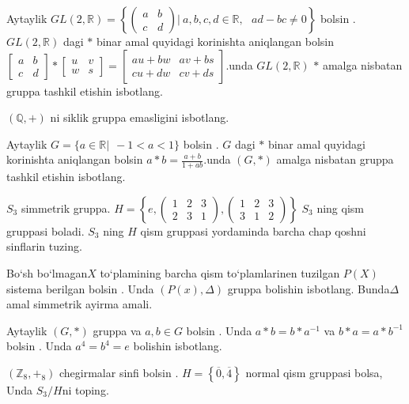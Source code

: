 Aytaylik \(GL(2,\mathbb{R}) = \left\{ \begin{pmatrix}
a & b \\
c & d
\end{pmatrix}|\ a,b,c,d\mathbb{\in R},\ \ \ ad - bc \neq 0 \right\}\) bo\textquotesingle lsin . \(GL(2,\mathbb{R})\) dagi \(*\) binar amal quyidagi ko\textquotesingle rinishta aniqlangan bo\textquotesingle lsin \(\begin{bmatrix}
a & b \\
c & d
\end{bmatrix}*\begin{bmatrix}
u & v \\
w & s
\end{bmatrix} = \begin{bmatrix}
au + bw & av + bs \\
cu + dw & cv + ds
\end{bmatrix}\).unda \(GL(2,\mathbb{R})\) \(*\) amalga nisbatan gruppa tashkil etishin isbotlang.

\((\mathbb{Q}, + )\) ni siklik gruppa emasligini isbotlang.

Aytaylik \(G = \{ a\mathbb{\in R}|\ \  - 1 < a < 1\}\) bo\textquotesingle lsin . \(G\) dagi \(*\) binar amal quyidagi ko\textquotesingle rinishta aniqlangan bo\textquotesingle lsin \(a*b = \frac{a + b}{1 + ab}.\)unda \((G,*)\) amalga nisbatan gruppa tashkil etishin isbotlang.

\(S_{3}\) simmetrik gruppa. \(H = \left\{ e,\begin{pmatrix}
1 & 2 & 3 \\
2 & 3 & 1
\end{pmatrix},\begin{pmatrix}
1 & 2 & 3 \\
3 & 1 & 2
\end{pmatrix} \right\}\) \(S_{3}\) ning qism gruppasi boladi. \(S_{3}\) ning \(H\) qism gruppasi yordaminda barcha chap qo\textquotesingle shni sinflarin tuzing.

Bo`sh bo`lmagan\(X\) to`plamining barcha qism to`plamlarinen tuzilgan \(P(X)\) sistema berilgan bo\textquotesingle lsin . Unda \((P(x),\Delta)\) gruppa bolishin isbotlang. Bunda\(\Delta\) amal simmetrik ayirma amali.

Aytaylik \((G,*)\) gruppa va \(a,b \in G\) bo\textquotesingle lsin . Unda \(a*b = b*a^{- 1}\) va \(b*a = a*b^{- 1}\) bo\textquotesingle lsin . Unda \(a^{4} = b^{4} = e\) bolishin isbotlang.

\(\left( \mathbb{Z}_{8}, +_{8} \right)\) chegirmalar sinfi bo\textquotesingle lsin . \(H = \left\{ \overline{0},\overline{4} \right\}\) normal qism gruppasi bolsa, Unda \(S_{3}/H\)ni toping.

